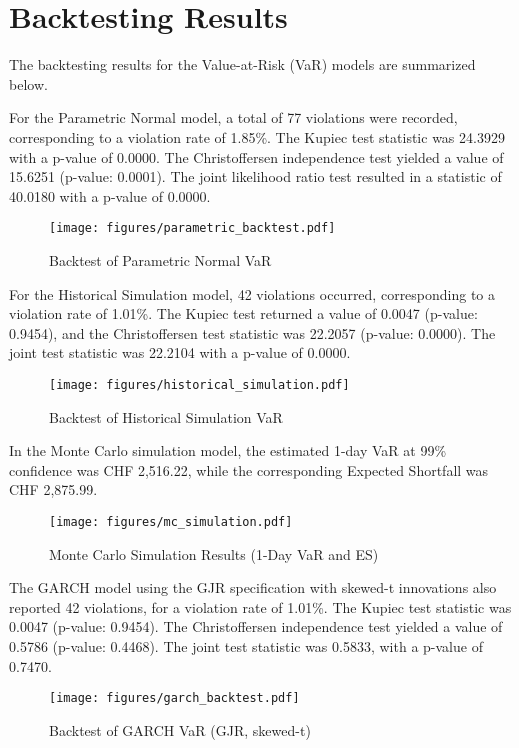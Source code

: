 \section*{Backtesting Results}

The backtesting results for the Value-at-Risk (VaR) models are summarized below.

For the Parametric Normal model, a total of 77 violations were recorded, corresponding to a violation rate of 1.85\%. The Kupiec test statistic was 24.3929 with a p-value of 0.0000. The Christoffersen independence test yielded a value of 15.6251 (p-value: 0.0001). The joint likelihood ratio test resulted in a statistic of 40.0180 with a p-value of 0.0000.

\begin{figure}[H]
    \centering
    \texttt{[image: figures/parametric\_backtest.pdf]}
    \caption{Backtest of Parametric Normal VaR}
\end{figure}

For the Historical Simulation model, 42 violations occurred, corresponding to a violation rate of 1.01\%. The Kupiec test returned a value of 0.0047 (p-value: 0.9454), and the Christoffersen test statistic was 22.2057 (p-value: 0.0000). The joint test statistic was 22.2104 with a p-value of 0.0000.

\begin{figure}[H]
    \centering
    \texttt{[image: figures/historical\_simulation.pdf]}
    \caption{Backtest of Historical Simulation VaR}
\end{figure}

In the Monte Carlo simulation model, the estimated 1-day VaR at 99\% confidence was CHF 2,516.22, while the corresponding Expected Shortfall was CHF 2,875.99.

\begin{figure}[H]
    \centering
    \texttt{[image: figures/mc\_simulation.pdf]}
    \caption{Monte Carlo Simulation Results (1-Day VaR and ES)}
\end{figure}

The GARCH model using the GJR specification with skewed-t innovations also reported 42 violations, for a violation rate of 1.01\%. The Kupiec test statistic was 0.0047 (p-value: 0.9454). The Christoffersen independence test yielded a value of 0.5786 (p-value: 0.4468). The joint test statistic was 0.5833, with a p-value of 0.7470.

\begin{figure}[H]
    \centering
    \texttt{[image: figures/garch\_backtest.pdf]}
    \caption{Backtest of GARCH VaR (GJR, skewed-t)}
\end{figure}
